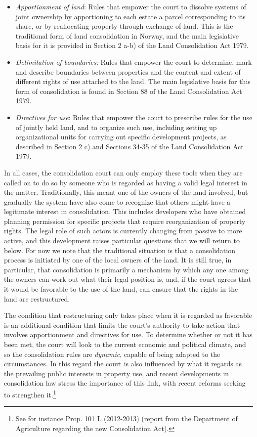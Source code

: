 \begin{itemize}
\item \emph{Apportionment of land}: Rules that empower the court to dissolve systems of joint ownership by apportioning to each estate a parcel corresponding to its share, or by reallocating property through exchange of land. This is the traditional form of land consolidation in Norway, and the main legislative basis for it is provided in Section 2 a-b) of the Land Consolidation Act 1979.
\item \emph{Delimitation of boundaries:} Rules that empower the court to determine, mark and describe boundaries between properties and the content and extent of different rights of use attached to the land. The main legislative basis for this form of consolidation is found in Section 88 of the Land Consolidation Act 1979.
\item \emph{Directives for use}: Rules that empower the court to prescribe rules for the use of jointly held land, and to organize such use, including setting up organizational units for carrying out specific development projects, as described in Section 2 c) and Sections 34-35 of the Land Consolidation Act 1979. 
\end{itemize}

In all cases, the consolidation court can only employ these tools when they are called on to do so by someone who is regarded as having a valid legal interest in the matter. Traditionally, this meant one of the owners of the land involved, but gradually the system have also come to recognize that others might have a legitimate interest in consolidation. This includes developers who have obtained planning permission for specific projects that require reorganization of property rights. The legal role of such actors is currently changing from passive to more active, and this development raises particular questions that we will return to below. For now we note that the traditional situation is that a consolidation process is initiated by one of the local owners of the land. It is still true, in particular, that consolidation is primarily a mechanism by which any one among the owners can work out what their legal position is, and, if the court agrees that it would be favorable to the use of the land, can ensure that the rights in the land are restructured.

The condition that restructuring only takes place when it is regarded as favorable is an additional condition that limits the court's authority to take action that involves apportionment and directives for use. To determine whether or not it has been met, the court will look to the current economic and political climate, and so the consolidation rules are \emph{dynamic}, capable of being adapted to the circumstances. In this regard the court is also influenced by what it regards as the prevailing public interests in property use, and recent developments in consolidation law stress the importance of this link, with recent reforms seeking to strengthen it.\footnote{See for instance Prop. 101 L (2012-2013) (report from the Department of Agriculture regarding the new Consolidation Act).}

